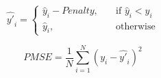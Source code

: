 
      $$\hat{y'}_i =
      \begin{cases}
        \hat{y}_i - Penalty, & \quad \textrm{if } \hat{y}_i < y_i \\
        \hat{y}_i,  & \quad \textrm{otherwise}
      \end{cases}$$

      $$PMSE = \frac{1}{N} \sum_{i = 1}^{N}\left(y_i - \hat{y'}_i\right)^2$$
